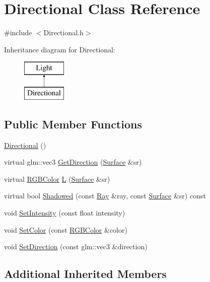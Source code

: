 \hypertarget{class_directional}{}\section{Directional Class Reference}
\label{class_directional}


{\ttfamily \#include $<$Directional.\+h$>$}

Inheritance diagram for Directional\+:\begin{figure}[H]
\begin{center}
\leavevmode
\includegraphics[height=2.000000cm]{class_directional}
\end{center}
\end{figure}
\subsection*{Public Member Functions}
\begin{DoxyCompactItemize}
\item 
\hyperlink{class_directional_a3e88e0e393dbb8e57dbb7218c5d9f8c1}{Directional} ()
\item 
virtual glm\+::vec3 \hyperlink{class_directional_a022fc1cb35f0f760b5472c06ad6e2e74}{Get\+Direction} (\hyperlink{class_surface}{Surface} \&sr)
\item 
virtual \hyperlink{class_r_g_b_color}{R\+G\+B\+Color} \hyperlink{class_directional_ac9a728a89d32c5f62ddef2be6c3e467d}{L} (\hyperlink{class_surface}{Surface} \&sr)
\item 
virtual bool \hyperlink{class_directional_a56a42abcdb41df1e3dd44b173aee494a}{Shadowed} (const \hyperlink{class_ray}{Ray} \&ray, const \hyperlink{class_surface}{Surface} \&sr) const
\item 
void \hyperlink{group___lights_gaa916930bad1e02ef24f89039151be8cd}{Set\+Intensity} (const float intensity)
\item 
void \hyperlink{group___lights_ga460c4d38eba389fd8e13d994249bbafc}{Set\+Color} (const \hyperlink{class_r_g_b_color}{R\+G\+B\+Color} \&color)
\item 
void \hyperlink{group___lights_ga497358d0a37e4a87d5e24f286695c0a6}{Set\+Direction} (const glm\+::vec3 \&direction)
\end{DoxyCompactItemize}
\subsection*{Additional Inherited Members}


